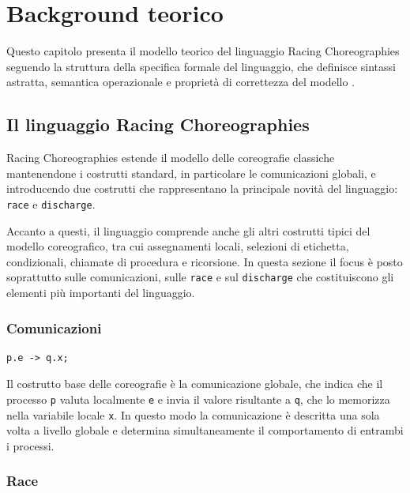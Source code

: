 \chapter{Background teorico}

Questo capitolo presenta il modello teorico del linguaggio Racing Choreographies seguendo la struttura della specifica formale del linguaggio, che definisce sintassi astratta, semantica operazionale e proprietà di correttezza del modello \cite{racingdraft}.

\section{Il linguaggio Racing Choreographies}

Racing Choreographies estende il modello delle coreografie classiche mantenendone i costrutti standard, in particolare le comunicazioni globali, e introducendo due costrutti che rappresentano la principale novità del linguaggio: \texttt{race} e \texttt{discharge}.

Accanto a questi, il linguaggio comprende anche gli altri costrutti tipici del modello coreografico, tra cui assegnamenti locali, selezioni di etichetta, condizionali, chiamate di procedura e ricorsione. In questa sezione il focus è posto soprattutto sulle comunicazioni, sulle \texttt{race} e sul \texttt{discharge} che costituiscono gli elementi più importanti del linguaggio.

\subsection*{Comunicazioni}

\begin{tcolorbox}[
colback=white,
colframe=black!35,
boxrule=0.4pt,
arc=1mm,
left=1.5mm,right=1.5mm,top=0.8mm,bottom=0.8mm
]
\begin{lstlisting}
p.e -> q.x;
\end{lstlisting}
\end{tcolorbox}

Il costrutto base delle coreografie è la comunicazione globale, che indica che il processo \texttt{p} valuta localmente \texttt{e} e invia il valore risultante a \texttt{q}, che lo memorizza nella variabile locale \texttt{x}. In questo modo la comunicazione è descritta una sola volta a livello globale e determina simultaneamente il comportamento di entrambi i processi.

\subsection*{Race}

